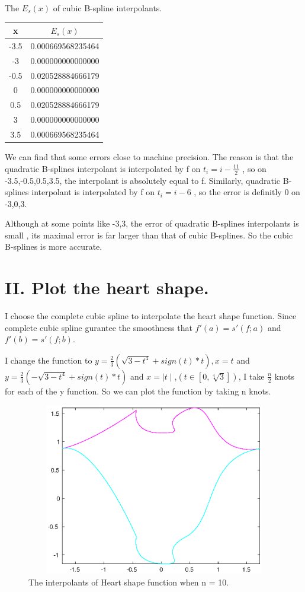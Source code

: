 \documentclass[twoside,a4paper]{article}
\begin{document}
The $E_s\left( x \right) $ of cubic B-spline interpolants.

\begin{tabular}{|c|c|}
\hline
x&$E_s(x)$\\
\hline
-3.5& 0.000669568235464\\
\hline
-3& 0.000000000000000\\
\hline
-0.5& 0.020528884666179\\
\hline
0& 0.000000000000000\\
\hline
0.5& 0.020528884666179\\
\hline
3& 0.000000000000000\\
\hline
3.5& 0.000669568235464\\
\hline
\end{tabular}

We can find that some errors close to machine precision.
The reason is that the quadratic B-splines interpolant is interpolated by f on $t_i=i-\frac{11}{2}$
, so on -3.5,-0.5,0.5,3.5, the interpolant is absolutely equal to f.
Similarly, quadratic B-splines interpolant is interpolated by f on $t_i=i-6$
, so the error is definitly 0 on -3,0,3.

Although at some points like -3,3, the error of quadratic B-splines interpolants is small
, its maximal error is far larger than that of cubic B-splines. So the cubic B-splines is more accurate.

\section*{II. \small{Plot the heart shape.}}

I choose the complete cubic spline to interpolate the heart shape function.
Since complete cubic spline gurantee the smoothness that $f'\left( a\right)=s'\left( f;a \right)  $ and $f'\left( b \right)=s'\left( f;b \right)  $.

I change the function to $y= \frac{2}{3}(\sqrt{3-t^{4}}+ sign(t)*t),x=t$ and
$y=\frac{2}{3}\left( -\sqrt{3-t^{4}} +sign(t)*t \right)$ and $x= \mid t \mid $,$\left( t\in[0,\sqrt[4]{3} ] \right)$,
I take $\frac{n}{2}$ knots for each of the y function. 
So we can plot the function by taking n knots.

\begin{figure}[ht]
        \centering
        \includegraphics[width=15cm, height=7.5cm]{HeartPlot_10.eps}
        \caption{The interpolants of Heart shape function when n = 10.}
\end{figure}
\end{document}

